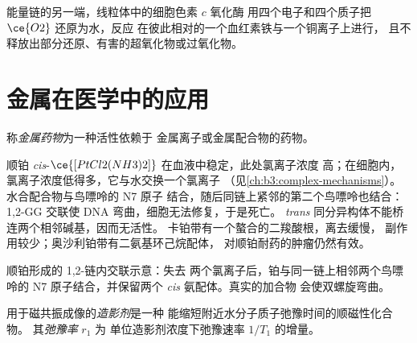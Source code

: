 能量链的另一端，线粒体中的细胞色素 $c$ 氧化酶
用四个电子和四个质子把 $\ce{O2}$ 还原为水，反应
在彼此相对的一个血红素铁与一个铜离子上进行，
且不释放出部分还原、有害的超氧化物或过氧化物。

\section{金属在医学中的应用}

\begin{definition}[金属药物]\label{def:b3:bioinorganic:metallodrug}
称\emph{金属药物}为一种活性依赖于
金属离子或金属配合物的药物。
\end{definition}

顺铂 \textit{cis}-$\ce{[PtCl2(NH3)2]}$ 在血液中稳定，此处氯离子浓度
高；在细胞内，氯离子浓度低得多，它与水交换一个氯离子
（见\cref{ch:b3:complex-mechanisms}）。水合配合物与鸟嘌呤的 N7 原子
结合，随后同链上紧邻的第二个鸟嘌呤也结合：1,2-GG
交联使 DNA 弯曲，细胞无法修复，于是死亡。
\textit{trans} 同分异构体不能桥连两个相邻碱基，因而无活性。
卡铂带有一个螯合的二羧酸根，离去缓慢，
副作用较少；奥沙利铂带有二氨基环己烷配体，
对顺铂耐药的肿瘤仍然有效。

\begin{omfigure}

{\small 顺铂形成的 1,2-链内交联示意：失去
两个氯离子后，铂与同一链上相邻两个鸟嘌呤的 N7
原子结合，并保留两个 \textit{cis} 氨配体。真实的加合物
会使双螺旋弯曲。}
\end{omfigure}

\begin{definition}[造影剂]\label{def:b3:bioinorganic:contrast}
用于磁共振成像的\emph{造影剂}是一种
能缩短附近水分子质子弛豫时间的顺磁性化合物。
其\emph{弛豫率} $r_1$ 为
单位造影剂浓度下弛豫速率 $1/T_1$ 的增量。
\end{definition}

